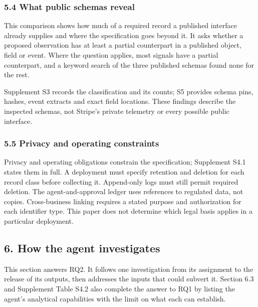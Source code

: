 \documentclass[
  11pt,
]{article}
\begin{document}
\hypertarget{what-public-schemas-reveal}{%
\subsubsection{5.4 What public schemas
reveal}\label{what-public-schemas-reveal}}

This comparison shows how much of a required record a published
interface already supplies and where the specification goes beyond it.
It asks whether a proposed observation has at least a partial
counterpart in a published object, field or event. Where the question
applies, most signals have a partial counterpart, and a keyword search
of the three published schemas found none for the rest.

Supplement S3 records the classification and its counts; S5 provides
schema pins, hashes, event extracts and exact field locations. These
findings describe the inspected schemas, not Stripe's private telemetry
or every possible public interface.

\hypertarget{privacy-and-operating-constraints}{%
\subsubsection{5.5 Privacy and operating
constraints}\label{privacy-and-operating-constraints}}

Privacy and operating obligations constrain the specification;
Supplement S4.1 states them in full. A deployment must specify retention
and deletion for each record class before collecting it. Append-only
logs must still permit required deletion. The agent-and-approval ledger
uses references to regulated data, not copies. Cross-business linking
requires a stated purpose and authorization for each identifier type.
This paper does not determine which legal basis applies in a particular
deployment.

\FloatBarrier

\hypertarget{how-the-agent-investigates}{%
\subsection{6. How the agent
investigates}\label{how-the-agent-investigates}}

\suppressfloats[t]

This section answers RQ2. It follows one investigation from its
assignment to the release of its outputs, then addresses the inputs that
could subvert it. Section 6.3 and Supplement Table S4.2 also complete
the answer to RQ1 by listing the agent's analytical capabilities with
the limit on what each can establish.
\end{document}
